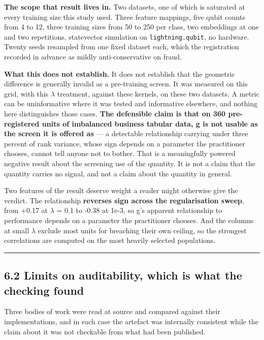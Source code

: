 \documentclass[
  10pt,
]{article}
\begin{document}
\textbf{The scope that result lives in.} Two datasets, one of which is
saturated at every training size this study used. Three feature
mappings, five qubit counts from 4 to 12, three training sizes from 50
to 250 per class, two embeddings at one and two repetitions, statevector
simulation on \texttt{lightning.qubit}, no hardware. Twenty seeds
resampled from one fixed dataset each, which the registration recorded
in advance as mildly anti-conservative on fraud.

\textbf{What this does not establish.} It does not establish that the
geometric difference is generally invalid as a pre-training screen. It
was measured on this grid, with this \(\lambda\) treatment, against
these kernels, on these two datasets. A metric can be uninformative
where it was tested and informative elsewhere, and nothing here
distinguishes those cases. \textbf{The defensible claim is that on 360
pre-registered units of imbalanced business tabular data, g is not
usable as the screen it is offered as} --- a detectable relationship
carrying under three percent of rank variance, whose sign depends on a
parameter the practitioner chooses, cannot tell anyone not to bother.
That is a meaningfully powered negative result about the screening use
of the quantity. It is not a claim that the quantity carries no signal,
and not a claim about the quantity in general.

Two features of the result deserve weight a reader might otherwise give
the verdict. The relationship \textbf{reverses sign across the
regularisation sweep}, from +0.17 at \(\lambda\) = 0.1 to -0.38 at 1e-3,
so g's apparent relationship to performance depends on a parameter the
practitioner chooses. And the columns at small \(\lambda\) exclude most
units for breaching their own ceiling, so the strongest correlations are
computed on the most heavily selected populations.

\begin{center}\rule{0.5\linewidth}{0.5pt}\end{center}

\subsection{6.2 Limits on auditability, which is what the checking
found}\label{limits-on-auditability-which-is-what-the-checking-found}

Three bodies of work were read at source and compared against their
implementations, and in each case the artefact was internally consistent
while the claim about it was not checkable from what had been published.
\end{document}
